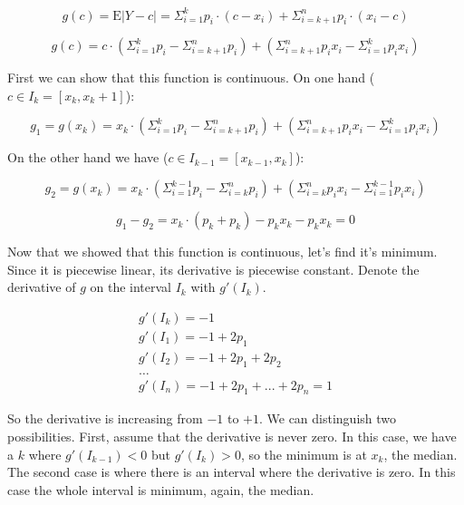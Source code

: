 \documentclass{article}
\begin{document}
\begin{equation}
    g(c) = \text{E} |Y-c| = \Sigma_{i=1}^{k}p_i \cdot (c - x_i) + \Sigma_{i=k+1}^{n}p_i \cdot (x_i - c)
\end{equation}

\begin{equation}
    g(c) = c\cdot (\Sigma_{i=1}^{k}p_i - \Sigma_{i=k+1}^{n}p_i) + (\Sigma_{i=k+1}^{n}p_i x_i - \Sigma_{i=1}^{k}p_i x_i)
\end{equation}

First we can show that this function is continuous. On one hand ($c\in I_k = [x_k, x_k+1]$):

\begin{equation}
    g_1 = g(x_k) = x_k\cdot (\Sigma_{i=1}^{k}p_i - \Sigma_{i=k+1}^{n}p_i) + (\Sigma_{i=k+1}^{n}p_i x_i - \Sigma_{i=1}^{k}p_i x_i)
\end{equation}

On the other hand we have ($c\in I_{k-1} = [x_{k-1}, x_k]$):

\begin{equation}
    g_2 = g(x_k) = x_k\cdot (\Sigma_{i=1}^{k-1}p_i - \Sigma_{i=k}^{n}p_i) + (\Sigma_{i=k}^{n}p_i x_i - \Sigma_{i=1}^{k-1}p_i x_i)
\end{equation}

\begin{equation}
    g_1 - g_2 = x_k \cdot (p_k + p_k) - p_k x_k - p_k x_k = 0
\end{equation}

Now that we showed that this function is continuous, let's find it's minimum. Since it is piecewise linear, its derivative is piecewise constant. Denote the derivative of $g$ on the interval $I_k$ with $g'(I_k)$.

\begin{equation}
    \begin{split}
        g'(I_k) = -1\\
        g'(I_1)= -1+2p_1\\
        g'(I_2)= -1+2p_1+2p_2\\
        \dots\\
        g'(I_n)= -1+2p_1+...+2p_n=1
    \end{split}
\end{equation}

So the derivative is increasing from $-1$ to $+1$. We can distinguish two possibilities. First, assume that the derivative is never zero. In this case, we have a $k$ where $g'(I_{k-1}) < 0$ but $g'(I_k) > 0$, so the minimum is at $x_k$, the median. The second case is where there is an interval where the derivative is zero. In this case the whole interval is minimum, again, the median.
\end{document}
